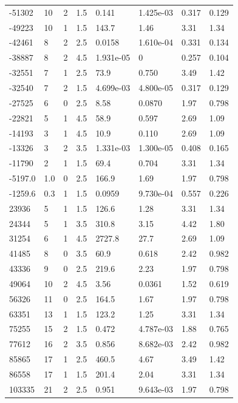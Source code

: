\documentclass[preview]{standalone}
\begin{document}
{{\begin{tabular}{L{1.2cm}C{1.2cm} C{0.3cm}C{0.5cm} C{1.4cm}C{1.4cm} C{1.4cm}C{1.4cm}}
  -51302  &    10  & 2     & 1.5 &  0.141  & 1.425e-03  & 0.317 &  0.129   \\ 
  -49223  &    10  & 1     & 1.5 &  143.7  & 1.46  & 3.31 &  1.34   \\ 
  -42461  &     8  & 2     & 2.5 &  0.0158  & 1.610e-04  & 0.331 &  0.134   \\ 
  -38887  &     8  & 2     & 4.5 &  1.931e-05  & 0  & 0.257 &  0.104   \\ 
  -32551  &     7  & 1     & 2.5 &  73.9  & 0.750  & 3.49 &  1.42   \\ 
  -32540  &     7  & 2     & 1.5 &  4.699e-03  & 4.800e-05  & 0.317 &  0.129   \\ 
  -27525  &     6  & 0     & 2.5 &  8.58  & 0.0870  & 1.97 &  0.798   \\ 
  -22821  &     5  & 1     & 4.5 &  58.9  & 0.597  & 2.69 &  1.09   \\ 
  -14193  &     3  & 1     & 4.5 &  10.9  & 0.110  & 2.69 &  1.09   \\ 
  -13326  &     3  & 2     & 3.5 &  1.331e-03  & 1.300e-05  & 0.408 &  0.165   \\ 
  -11790  &     2  & 1     & 1.5 &  69.4  & 0.704  & 3.31 &  1.34   \\ 
  -5197.0  &   1.0  & 0     & 2.5 &  166.9  & 1.69  & 1.97 &  0.798   \\ 
  -1259.6  &   0.3  & 1     & 1.5 &  0.0959  & 9.730e-04  & 0.557 &  0.226   \\ 
  23936  &     5  & 1     & 1.5 &  126.6  & 1.28  & 3.31 &  1.34   \\ 
  24344  &     5  & 1     & 3.5 &  310.8  & 3.15  & 4.42 &  1.80   \\ 
  31254  &     6  & 1     & 4.5 &  2727.8  & 27.7  & 2.69 &  1.09   \\ 
  41485  &     8  & 0     & 3.5 &  60.9  & 0.618  & 2.42 &  0.982   \\ 
  43336  &     9  & 0     & 2.5 &  219.6  & 2.23  & 1.97 &  0.798   \\ 
  49064  &    10  & 2     & 4.5 &  3.56  & 0.0361  & 1.52 &  0.619   \\ 
  56326  &    11  & 0     & 2.5 &  164.5  & 1.67  & 1.97 &  0.798   \\ 
  63351  &    13  & 1     & 1.5 &  123.2  & 1.25  & 3.31 &  1.34   \\ 
  75255  &    15  & 2     & 1.5 &  0.472  & 4.787e-03  & 1.88 &  0.765   \\ 
  77612  &    16  & 2     & 3.5 &  0.856  & 8.682e-03  & 2.42 &  0.982   \\ 
  85865  &    17  & 1     & 2.5 &  460.5  & 4.67  & 3.49 &  1.42   \\ 
  86558  &    17  & 1     & 1.5 &  201.4  & 2.04  & 3.31 &  1.34   \\ 
  103335  &    21  & 2     & 2.5 &  0.951  & 9.643e-03  & 1.97 &  0.798   \\ 
\hline 
\end{tabular} 

}}
\end{document}
